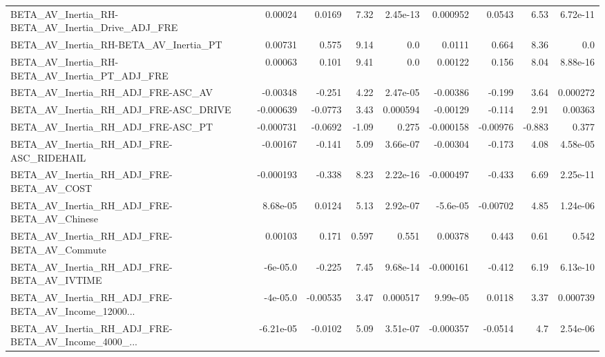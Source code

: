 \begin{tabular}{lrrrrrrrr}
BETA\_AV\_Inertia\_RH-BETA\_AV\_Inertia\_Drive\_ADJ\_FRE   &     0.00024 &       0.0169 &     7.32 & 2.45e-13 &   0.000952 &      0.0543 &         6.53 &      6.72e-11 \\
BETA\_AV\_Inertia\_RH-BETA\_AV\_Inertia\_PT              &     0.00731 &        0.575 &     9.14 &      0.0 &     0.0111 &       0.664 &         8.36 &           0.0 \\
BETA\_AV\_Inertia\_RH-BETA\_AV\_Inertia\_PT\_ADJ\_FRE      &     0.00063 &        0.101 &     9.41 &      0.0 &    0.00122 &       0.156 &         8.04 &      8.88e-16 \\
BETA\_AV\_Inertia\_RH\_ADJ\_FRE-ASC\_AV                  &    -0.00348 &       -0.251 &     4.22 & 2.47e-05 &   -0.00386 &      -0.199 &         3.64 &      0.000272 \\
BETA\_AV\_Inertia\_RH\_ADJ\_FRE-ASC\_DRIVE               &   -0.000639 &      -0.0773 &     3.43 & 0.000594 &   -0.00129 &      -0.114 &         2.91 &       0.00363 \\
BETA\_AV\_Inertia\_RH\_ADJ\_FRE-ASC\_PT                  &   -0.000731 &      -0.0692 &    -1.09 &    0.275 &  -0.000158 &    -0.00976 &       -0.883 &         0.377 \\
BETA\_AV\_Inertia\_RH\_ADJ\_FRE-ASC\_RIDEHAIL            &    -0.00167 &       -0.141 &     5.09 & 3.66e-07 &   -0.00304 &      -0.173 &         4.08 &      4.58e-05 \\
BETA\_AV\_Inertia\_RH\_ADJ\_FRE-BETA\_AV\_COST            &   -0.000193 &       -0.338 &     8.23 & 2.22e-16 &  -0.000497 &      -0.433 &         6.69 &      2.25e-11 \\
BETA\_AV\_Inertia\_RH\_ADJ\_FRE-BETA\_AV\_Chinese         &    8.68e-05 &       0.0124 &     5.13 & 2.92e-07 &   -5.6e-05 &    -0.00702 &         4.85 &      1.24e-06 \\
BETA\_AV\_Inertia\_RH\_ADJ\_FRE-BETA\_AV\_Commute         &     0.00103 &        0.171 &    0.597 &    0.551 &    0.00378 &       0.443 &         0.61 &         0.542 \\
BETA\_AV\_Inertia\_RH\_ADJ\_FRE-BETA\_AV\_IVTIME          &    -6e-05.0 &       -0.225 &     7.45 & 9.68e-14 &  -0.000161 &      -0.412 &         6.19 &      6.13e-10 \\
BETA\_AV\_Inertia\_RH\_ADJ\_FRE-BETA\_AV\_Income\_12000... &    -4e-05.0 &     -0.00535 &     3.47 & 0.000517 &   9.99e-05 &      0.0118 &         3.37 &      0.000739 \\
BETA\_AV\_Inertia\_RH\_ADJ\_FRE-BETA\_AV\_Income\_4000\_... &   -6.21e-05 &      -0.0102 &     5.09 & 3.51e-07 &  -0.000357 &     -0.0514 &          4.7 &      2.54e-06 \\

\end{tabular}
